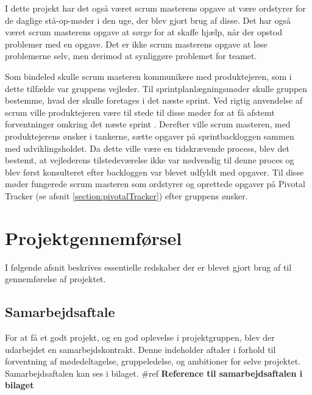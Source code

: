 \noindent I dette projekt har det også været scrum masterens opgave at være ordstyrer for de daglige stå-op-møder i den uge, der blev gjort brug af disse. Det har også været scrum masterens opgave at sørge for at skaffe hjælp, når der opstod problemer med en opgave. Det er ikke scrum masterens opgave at løse problemerne selv, men derimod at synliggøre problemet for teamet. \newline

\noindent Som bindeled skulle scrum masteren kommunikere med produktejeren, som i dette tilfælde var gruppens vejleder. Til sprintplanlægningsmøder skulle gruppen bestemme, hvad der skulle foretages i det næste sprint. Ved rigtig anvendelse af scrum ville produktejeren være til stede til disse møder for at få afstemt forventninger omkring det næste sprint \cite{scrumProductOwner}. Derefter ville scrum masteren, med produktejerens ønsker i tankerne, sætte opgaver på sprintbackloggen sammen med udviklingsholdet. Da dette ville være en tidskrævende process, blev det bestemt, at vejlederens tilstedeværelse ikke var nødvendig til denne proces og blev først konsulteret efter backloggen var blevet udfyldt med opgaver. Til disse møder fungerede scrum masteren som ordstyrer og oprettede opgaver på Pivotal Tracker (se afsnit \ref{section:pivotalTracker}) efter gruppens ønsker. \par 

\chapter{Projektgennemførsel}
I følgende afsnit beskrives essentielle redskaber der er blevet gjort brug af til gennemførelse af projektet. 

\section{Samarbejdsaftale}
For at få et godt projekt, og en god oplevelse i projektgruppen, blev der udarbejdet en samarbejdskontrakt. Denne indeholder aftaler i forhold til forventning af mødedeltagelse, gruppeledelse, og ambitioner for selve projektet. Samarbejdsaftalen kan ses i bilaget. \#ref \textbf{Reference til samarbejdsaftalen i bilaget}

